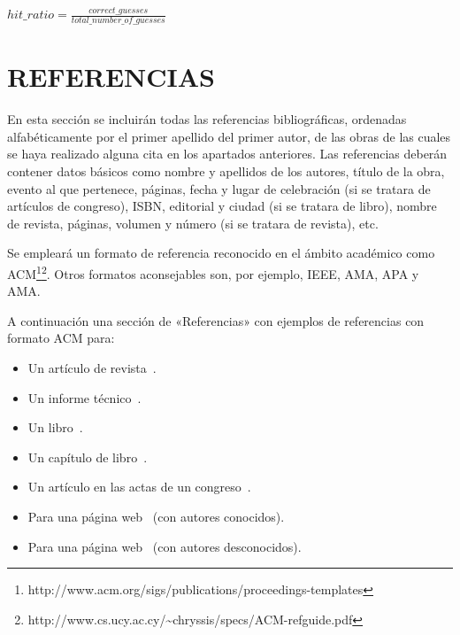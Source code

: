 \documentclass{pre-tfg}
\begin{document}
$hit\_ratio = \frac{correct\_guesses}{total\_number\_of\_guesses}$


\section{REFERENCIAS}

En esta sección se incluirán todas las referencias bibliográficas, ordenadas
alfabéticamente por el primer apellido del primer autor, de las obras de las cuales se
haya realizado alguna cita en los apartados anteriores. Las referencias deberán contener
datos básicos como nombre y apellidos de los autores, título de la obra, evento al que
pertenece, páginas, fecha y lugar de celebración (si se tratara de artículos de congreso),
ISBN, editorial y ciudad (si se tratara de libro), nombre de revista, páginas, volumen y
número (si se tratara de revista), etc.

Se empleará un formato de referencia reconocido en el ámbito académico como
ACM\footnote{http://www.acm.org/sigs/publications/proceedings-templates}\footnote{http://www.cs.ucy.ac.cy/\~{}chryssis/specs/ACM-refguide.pdf}.
Otros formatos aconsejables son, por ejemplo, IEEE, AMA, APA y AMA.

A continuación una sección de «Referencias» con ejemplos de referencias con formato ACM para:

\begin{itemize}
\item Un artículo de revista~\cite{Bow93}.
\item Un informe técnico~\cite{Ding97}.
\item Un libro~\cite{Tavel07}.
\item Un capítulo de libro~\cite{Greiner99}.
\item Un artículo en las actas de un congreso~\cite{Frohlic00}.
\item Para una página web~\cite{Steele04} (con autores conocidos).
\item Para una página web~\cite{Oxygen} (con autores desconocidos).
\end{itemize}



\singlespacing

\end{document}
